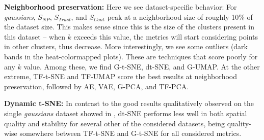 \noindent\textbf{Neighborhood preservation:}
Here we see dataset-specific behavior: For \emph{gaussians}, $S_{NP}$, $S_{Trust}$, and $S_{Cont}$ peak at a neighborhood size of roughly 10\% of the dataset size. This makes sense since this is the size of the clusters present in this dataset -- when $k$ exceeds this value, the metrics will start considering points in other clusters, thus decrease. More interestingly, we see some outliers (dark bands in the heat-colormapped plots). These are techniques that score poorly for any $k$ value. Among these, we find G-t-SNE, dt-SNE, and G-UMAP. At the other extreme, TF-t-SNE and TF-UMAP score the best results at neighborhood preservation, followed by AE, VAE, G-PCA, and TF-PCA.


\noindent\textbf{Dynamic t-SNE:} In contrast to the good results qualitatively observed on the single \emph{gaussians} dataset showed in \cite{Rauber2016}, dt-SNE performs less well in both spatial quality and stability for several other of the considered datasets, being quality-wise somewhere between TF-t-SNE and G-t-SNE for all considered metrics.

%




